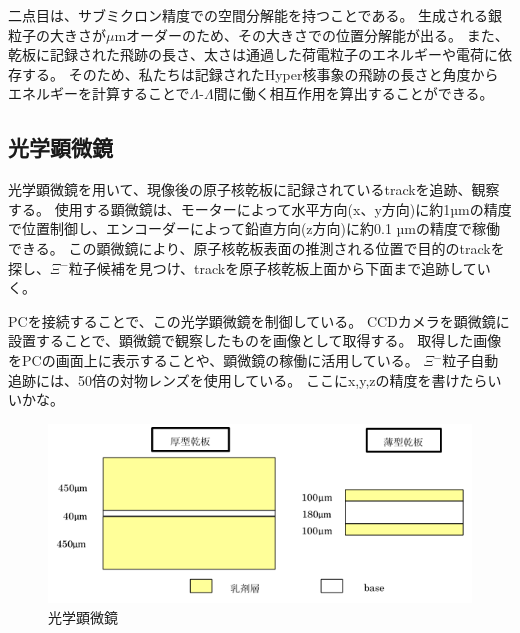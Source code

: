 \documentclass[12pt,a4paper]{jarticle}
\begin{document}
二点目は、サブミクロン精度での空間分解能を持つことである。
生成される銀粒子の大きさが$\mu$mオーダーのため、その大きさでの位置分解能が出る。
また、乾板に記録された飛跡の長さ、太さは通過した荷電粒子のエネルギーや電荷に依存する。
そのため、私たちは記録されたHyper核事象の飛跡の長さと角度からエネルギーを計算することで$\Lambda$-$\Lambda$間に働く相互作用を算出することができる。
\subsection{光学顕微鏡}
光学顕微鏡を用いて、現像後の原子核乾板に記録されているtrackを追跡、観察する。
使用する顕微鏡は、モーターによって水平方向(x、y方向)に約1µmの精度で位置制御し、エンコーダーによって鉛直方向(z方向)に約0.1 µmの精度で稼働できる。
この顕微鏡により、原子核乾板表面の推測される位置で目的のtrackを探し、$\Xi$$^-$粒子候補を見つけ、trackを原子核乾板上面から下面まで追跡していく。
\par
PCを接続することで、この光学顕微鏡を制御している。
CCDカメラを顕微鏡に設置することで、顕微鏡で観察したものを画像として取得する。
取得した画像をPCの画面上に表示することや、顕微鏡の稼働に活用している。
$\Xi$$^-$粒子自動追跡には、50倍の対物レンズを使用している。
ここにx,y,zの精度を書けたらいいかな。
\begin{figure}[htbp]
  \centering
     \includegraphics[width=140mm]{emulsionorder.png}
  \caption{光学顕微鏡\label{fig:microscope}}
\end{figure}
\newpage
\end{document}
